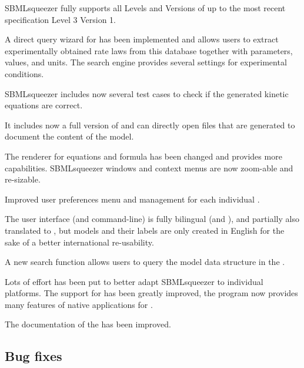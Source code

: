\begin{dinglist}{52}
\item SBMLsqueezer fully supports all Levels and Versions of \SBML up to the most
      recent specification Level 3 Version 1.
\item A direct query wizard for \SABIO has been implemented and allows users to
      extract experimentally obtained rate laws from this database together with
      parameters, values, and units. The search engine provides several settings for
      experimental conditions.
\item SBMLsqueezer includes now several \JUnit test cases to check if the generated
      kinetic equations are correct.
\item It includes now a full version of \SBMLLaTeX and can directly open \PDF files
      that are generated to document the content of the model.
\item The renderer for equations and formula has been changed and provides more
      capabilities. SBMLsqueezer windows and context menus are now zoom-able and
      re-sizable.
\item Improved user preferences menu and management for each individual \OS.
\item The user interface (\GUI and command-line) is fully bilingual (\German and \English), and partially also
      translated to \Chinese, but models and their labels are only created in English for the sake
      of a better international re-usability.
\item A new search function allows users to query the model data structure in the
      \GUI.
\item Lots of effort has been put to better adapt SBMLsqueezer to individual
      platforms. The support for \MacOSX has been greatly improved, the program now
      provides many features of native applications for \MacOSX.
\item The documentation of the \API has been improved.
\end{dinglist}

\subsection{Bug fixes}


